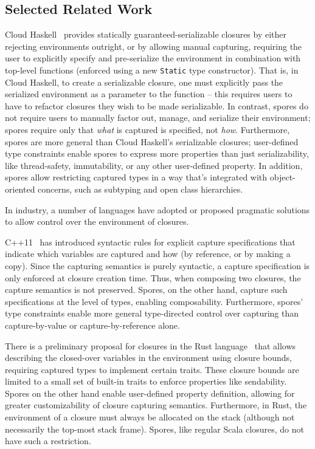 \documentclass{llncs}
\begin{document}
\subsection{Selected Related Work}\label{sec:sel-rel-work}

Cloud Haskell~\cite{CloudHaskell} provides statically guaranteed-serializable
closures by either rejecting environments outright, or by allowing manual
capturing, requiring the user to explicitly specify and pre-serialize the
environment in combination with top-level functions (enforced using a new
\verb|Static| type constructor). That is, in Cloud Haskell, to create a
serializable closure, one must explicitly pass the serialized environment as a
parameter to the function -- this requires users to have to refactor closures
they wish to be made serializable. In contrast, spores
do not require users to manually factor out, manage, and serialize their
environment; spores require only that {\em what} is captured is specified, not
{\em how}. Furthermore, spores are more general than Cloud Haskell's
serializable closures; user-defined type constraints enable spores to
express more properties than just serializability, like thread-safety,
immutability, or any other user-defined property. In addition, spores allow
restricting captured types in a way that's integrated with object-oriented
concerns, such as subtyping and open class hierarchies.

In industry, a number of languages have adopted or proposed pragmatic
solutions to allow control over the environment of closures.

C++11~\cite{CplusplusLambas} has introduced syntactic rules for explicit
capture specifications that indicate which variables are captured and how (by
reference, or by making a copy). Since the capturing semantics is purely
syntactic, a capture specification is only enforced at closure creation time.
Thus, when composing two closures, the capture semantics is not preserved.
Spores, on the other hand, capture such specifications at the level of types,
enabling composability. Furthermore, spores' type constraints enable more
general type-directed control over capturing than capture-by-value or
capture-by-reference alone.

There is a preliminary proposal for closures in the Rust
language~\cite{RustFunctions} that allows describing the closed-over variables
in the environment using closure bounds, requiring captured types to implement
certain traits. These closure bounds are limited to a small set of built-in
traits to enforce properties like sendability. Spores on the other hand enable
user-defined property definition, allowing for greater customizability of
closure capturing semantics. Furthermore, in Rust, the environment of a
closure must always be allocated on the stack (although not necessarily the
top-most stack frame). Spores, like regular Scala closures, do not have such a
restriction.
\end{document}
